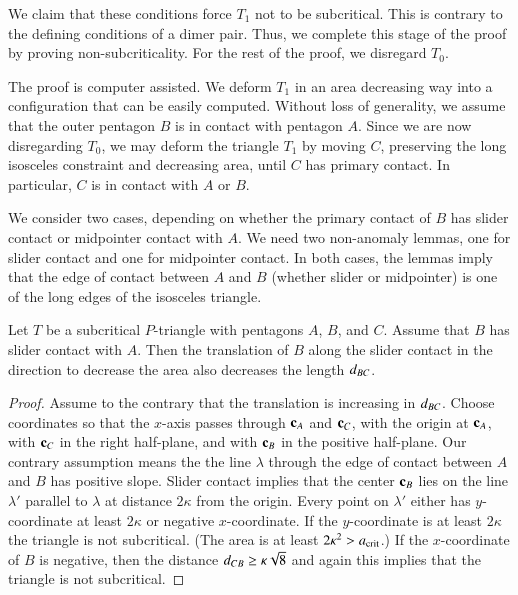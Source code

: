 We claim that these conditions force $T_1$ not to be subcritical.
This is contrary to the defining conditions of a dimer pair.  Thus, we
complete this stage of the proof by proving non-subcriticality. For
the rest of the proof, we disregard $T_0$.

The proof is computer assisted.  We deform $T_1$ in an area decreasing
way into a configuration that can be easily computed.  Without loss of
generality, we assume that the outer pentagon $B$ is in contact with
pentagon $A$.  Since we are now disregarding $T_0$, we may deform the
triangle $T_1$ by moving $C$, preserving the long isosceles constraint
and decreasing area, until $C$ has primary contact.  In particular,
$C$ is in contact with $A$ or $B$.

We consider two cases, depending on whether the primary contact of $B$
has slider contact or midpointer contact with $A$.  We need two
non-anomaly lemmas, one for slider contact and one for midpointer
contact.  In both cases, the lemmas imply that the edge of contact
between $A$ and $B$ (whether slider or midpointer) is one of the long
edges of the isosceles triangle.

\begin{lemma}  
  Let $T$ be a subcritical $P$-triangle with pentagons $A$, $B$, and
  $C$.  Assume that $B$ has slider contact with $A$.  Then the
  translation of $B$ along the slider contact in the direction to
  decrease the area also decreases the length $d_{BC}$.
\end{lemma}

\begin{proof} 
  Assume to the contrary that the translation is increasing in
  $d_{BC}$.  Choose coordinates so that the $x$-axis passes through
  ${\mathbf c}_A$ and ${\mathbf c}_C$, with the origin at ${\mathbf c}_A$, with ${\mathbf c}_C$ in the
  right half-plane, and with ${\mathbf c}_B$ in the positive half-plane.  Our
  contrary assumption means the the line $\lambda$ through the edge of
  contact between $A$ and $B$ has positive slope.  Slider contact
  implies that the center ${\mathbf c}_B$ lies on the line $\lambda'$ parallel
  to $\lambda$ at distance $2\kappa$ from the origin.  Every point on
  $\lambda'$ either has $y$-coordinate at least $2\kappa$ or negative
  $x$-coordinate.  If the $y$-coordinate is at least $2\kappa$ the
  triangle is not subcritical.  (The area is at least
  $2\kappa^2>a_\text{crit}$.) If the $x$-coordinate of $B$ is negative, then
  the distance $d_{CB} \ge\kappa\sqrt8$ and again this implies that
  the triangle is not subcritical.
\end{proof}

